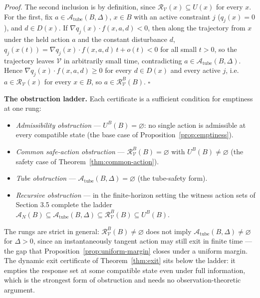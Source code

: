 \documentclass[11pt]{article}
\theoremstyle{definition}
\begin{document}
\emph{Proof.} The second inclusion is by definition, since
\(\mathcal{R}_{\mathcal{V}}(x)\subseteq U(x)\) for every \(x\). For the
first, fix \(a\in\mathcal{A}_{\mathrm{tube}}(B,\Delta)\), \(x\in B\) with
an active constraint \(j\) (\(q_j(x)=0\)), and \(d\in D(x)\). If
\(\nabla q_j(x)\cdot f(x,a,d)<0\), then along the trajectory from \(x\)
under the held action \(a\) and the constant disturbance \(d\),
\(q_j(x(t))=\nabla q_j(x)\cdot f(x,a,d)\,t+o(t)<0\) for all small
\(t>0\), so the trajectory leaves \(\mathcal V\) in arbitrarily small
time, contradicting \(a\in\mathcal{A}_{\mathrm{tube}}(B,\Delta)\). Hence
\(\nabla q_j(x)\cdot f(x,a,d)\ge 0\) for every \(d\in D(x)\) and every
active \(j\), i.e.\ \(a\in\mathcal{R}_{\mathcal{V}}(x)\) for every
\(x\in B\), so \(a\in\mathcal{R}_{\mathcal{V}}^B(B)\). \ensuremath{\square}

\textbf{The obstruction ladder.} Each certificate is a sufficient
condition for emptiness at one rung:
\begin{itemize}
\item \emph{Admissibility obstruction} --- \(U^B(B)=\varnothing\): no
single action is admissible at every compatible state (the base case of
Proposition~\ref{prop:emptiness}).
\item \emph{Common safe-action obstruction} ---
\(\mathcal{R}_{\mathcal{V}}^B(B)=\varnothing\) with
\(U^B(B)\neq\varnothing\) (the safety case of
Theorem~\ref{thm:common-action}).
\item \emph{Tube obstruction} ---
\(\mathcal{A}_{\mathrm{tube}}(B,\Delta)=\varnothing\) (the tube-safety
form).
\item \emph{Recursive obstruction} --- in the finite-horizon setting the
witness action sets of Section 3.5 complete the ladder
\(\mathcal{A}_N(B)\subseteq\mathcal{A}_{\mathrm{tube}}(B,\Delta)\subseteq\mathcal{R}_{\mathcal{V}}^B(B)\subseteq U^B(B)\).
\end{itemize}
The rungs are strict in general: \(\mathcal{R}_{\mathcal{V}}^B(B)\neq\varnothing\)
does not imply \(\mathcal{A}_{\mathrm{tube}}(B,\Delta)\neq\varnothing\)
for \(\Delta>0\), since an instantaneously tangent action may still exit
in finite time --- the gap that Proposition~\ref{prop:uniform-margin}
closes under a uniform margin. The dynamic exit certificate of
Theorem~\ref{thm:exit} sits below the ladder: it empties the response
set at some compatible state even under full information, which is the
strongest form of obstruction and needs no observation-theoretic
argument.
\end{document}
